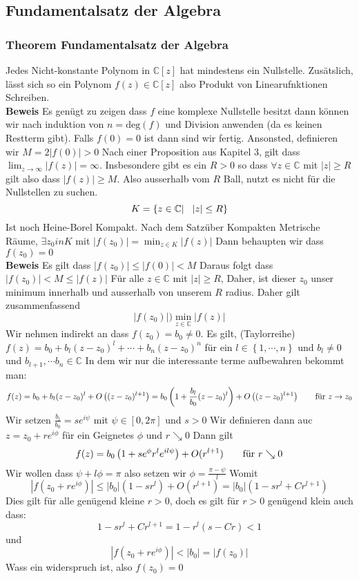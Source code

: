 \documentclass{article}
\newcommand{\mspc}{\hspace{0.7cm}}
\newcommand{\smspc}{\hspace{0.3cm}}
\newcommand{\beweis}{\\\textbf{Beweis }}
\newcommand{\theorem}[1]{\subsubsection*{Theorem {#1}}}
\begin{document}
\subsection*{Fundamentalsatz der Algebra}
\theorem{Fundamentalsatz der Algebra} Jedes Nicht-konstante Polynom in $\mathbb{C }[z]$ hat mindestens ein Nullstelle. Zusätslich, lässt sich so ein Polynom $f(z)\in \mathbb{C }[z]$ also Produkt von Linearufnktionen Schreiben.
\beweis Es genügt zu zeigen dass $f$ eine komplexe Nullstelle besitzt dann können wir nach induktion von $n=\text{deg}(f)$ und Division anwenden (da es keinen Restterm gibt).
\newline Falls $f(0)=0$ ist dann sind wir fertig. Ansonsted, definieren wir $M=2|f(0)|>0$
Nach einer Proposition aus Kapitel 3, gilt dass $\lim_{z\rightarrow\infty}|f(z)|=\infty$. Insbesondere gibt es ein $R>0$ so dass $\forall z\in \mathbb{C}$ mit $|z|\ge R$ gilt also dass $|f(z)|\ge M$. Also ausserhalb vom $R$ Ball, nutzt es nicht für die Nullstellen zu suchen.
\[K=\left\lbrace z\in \mathbb{C }| \smspc |z| \le R\right\rbrace\] Ist noch Heine-Borel Kompakt. Nach dem Satzüber Kompakten Metrische Räume, $\exists z_0 in K$ mit $|f(z_0)|=\min_{z\in K}|f(z)|$  Dann behaupten wir dass $f(z_0)=0$ 
\beweis Es gilt dass $|f(z_0)|\le |f(0)|< M$ Daraus folgt dass $|f(z_0)|<M\le|f(z)|$ Für alle $z\in \mathbb{C }$ mit $|z|\ge R$, Daher, ist dieser $z_0$ unser minimum innerhalb und ausserhalb von unserem $R$ radius. Daher gilt zusammenfassend \[|f(z_0)|)\min_{z\in \mathbb{C }}|f(z)|\]
Wir nehmen indirekt an dass $f(z_0)=b_0\neq 0$. Es gilt, (Taylorreihe) $f(z)=b_0+b_l(z-z_0)^l+\cdots+b_n(z-z_0)^n$ für ein $l\in \left\lbrace1, \cdots, n\right\rbrace$ und $b_l\neq 0$ und $b_{l+1}, \cdots b_n \in \mathbb{C }$
In dem wir nur die interessante terme aufbewahren bekommt man:
\[f(z)=b_0+b_l(z-z_0)^l+O\left((z-z_0)^{l+1}\right)=b_0\left(1+\frac{b_l}{b_0}(z-z_0)^l\right)+O\left((z-z_0)^{l+1}\right) \mspc \text{für  } z \rightarrow z_0\]
Wir setzen $\frac{b_l}{b_0}=se^{i\psi}$ mit $\psi\in [0, 2\pi]$ und $s>0$ Wir definieren dann auc $z=z_0+re^{i\phi}$ für ein Geignetes $\phi$ und $r\searrow 0$
Dann gilt \[f(z)=b_0\left(1+se^{\phi}r^le^{il\psi}\right)+O(r^{l+1})\mspc \text{für }r\searrow 0\]
Wir wollen dass $\psi+l\phi=\pi$ also setzen wir $\phi=\frac{\pi-\psi}{l }$ Womit \[|f(z_0+re^{i\phi})|\le|b_0|\left(1-sr^l\right)+O\left(r^{l+1}\right)=|b_0|\left(1-sr^l+Cr^{l+1}\right)\]
Dies gilt für alle genügend kleine $r>0$, doch es gilt für $r>0$ genügend klein auch dass:
\[1-sr^l+Cr^{l+1}=1-r^l(s-Cr)<1\]
und \[|f(z_0+re^{i\phi})|<|b_0|=|f(z_0)|\]
Wass ein widerspruch ist, also $f(z_0)=0$
\end{document}
